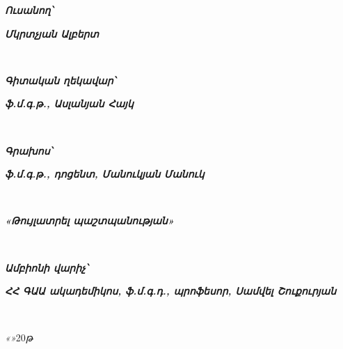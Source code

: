{
    \linespread{1}
    {
        \large
        \raggedright
        \parbox[t]{2.5cm}{\textbf{\textit{Ուսանող՝}}}
        \parbox[t]{0cm}{\underline{\hspace{4cm}} \scriptsize{}} \hfill
        \parbox[t]{9.5cm}{\textbf{\textit{Մկրտչյան Ալբերտ}}} \\
    }

    \vspace{2cm}
    {
        \large
        \raggedright
        \parbox[t]{5.2cm}{\textbf{\textit{Գիտական ղեկավար՝}}}
        \parbox[t]{0cm}{\underline{\hspace{4cm}} \scriptsize{}} \hfill
        \parbox[t]{6.9cm}{\raggedright\textbf{\textit{ֆ.մ.գ.թ., Ասլանյան Հայկ}}} \\
    }

    \vspace{2cm}
    {
        \large
        \raggedright
        \parbox[t]{2.5cm}{\textbf{\textit{Գրախոս՝}}}
        \parbox[t]{0cm}{\underline{\hspace{4cm}} \scriptsize{}} \hfill
        \parbox[t]{9.5cm}{\textbf{\textit{ֆ.մ.գ.թ., դոցենտ, Մանուկյան Մանուկ}}} \\
    }


    \vfill
    {
        \large
        \raggedright
        \textbf{\textit{«Թույլատրել պաշտպանության»}}
    } \\

    \vspace{2cm}
    {
        \large
        \raggedright
        \parbox[t]{3.9cm}{\textbf{\textit{Ամբիոնի վարիչ՝}}}
        \parbox[t]{2cm}{\underline{\hspace{4cm}} \scriptsize{}} \hfill
        \parbox[t]{8cm}{\raggedright\textbf{\textit{ՀՀ ԳԱԱ ակադեմիկոս, ֆ.մ.գ.դ., պրոֆեսոր, Սամվել Շուքուրյան}}} \\
    }

    \vspace{1.5cm}
    {
        \raggedright
        \large
        \textit{«}\underline{\hspace{1.5cm}}\textit{»}\underline{\hspace{2.5cm}}20\underline{\hspace{0.5cm}}\textit{թ} \\
    }

    \newpage
}